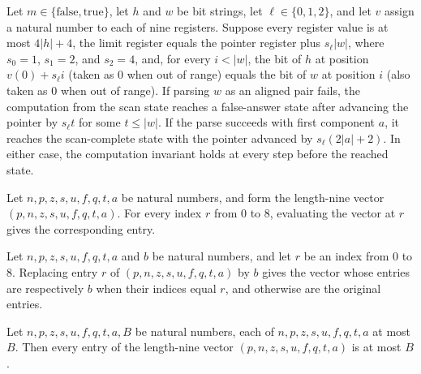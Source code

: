 \begin{lemma}
\label{Complexity.drop_pair_run}
\leanok
{}
Let $m\in\{\mathrm{false},\mathrm{true}\}$, let $h$ and $w$ be bit strings, let
$\ell\in\{0,1,2\}$, and let $v$ assign a natural number to each of nine registers.
Suppose every register value is at most $4|h|+4$, the limit register equals the pointer
register plus $s_\ell|w|$, where $s_0=1$, $s_1=2$, and $s_2=4$, and, for every $i<|w|$,
the bit of $h$ at position $v(0)+s_\ell i$ (taken as $0$ when out of range) equals the
bit of $w$ at position $i$ (also taken as $0$ when out of range). If parsing $w$ as an
aligned pair fails, the computation from the scan state reaches a false-answer state
after advancing the pointer by $s_\ell t$ for some $t\le |w|$. If the parse succeeds
with first component $a$, it reaches the scan-complete state with the pointer advanced
by $s_\ell(2|a|+2)$. In either case, the computation invariant holds at every step
before the reached state.
\end{lemma}

\begin{lemma}
\label{Complexity.dropValues_apply}
\leanok
{}
Let $n,p,z,s,u,f,q,t,a$ be natural numbers, and form the length-nine vector
$(p,n,z,s,u,f,q,t,a)$. For every index $r$ from $0$ to $8$, evaluating the vector at $r$
gives the corresponding entry.
\end{lemma}

\begin{lemma}
\label{Complexity.dropValues_update}
\leanok
{}
Let $n,p,z,s,u,f,q,t,a$ and $b$ be natural numbers, and let $r$ be an index from $0$ to
$8$. Replacing entry $r$ of $(p,n,z,s,u,f,q,t,a)$ by $b$ gives the vector whose entries
are respectively $b$ when their indices equal $r$, and otherwise are the original
entries.
\end{lemma}

\begin{lemma}
\label{Complexity.dropValues_bound}
\leanok
{}
Let $n,p,z,s,u,f,q,t,a,B$ be natural numbers, each of $n,p,z,s,u,f,q,t,a$ at most $B$.
Then every entry of the length-nine vector $(p,n,z,s,u,f,q,t,a)$ is at most $B$.
\end{lemma}

